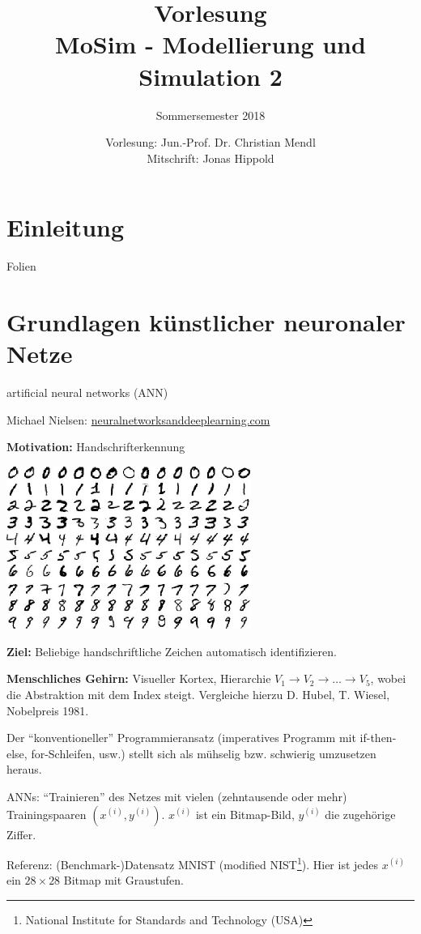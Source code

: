 \documentclass[
 a4paper,
 12pt,
 parskip=half
 ]{scrreprt}
\title{%
  Vorlesung\\
  MoSim - Modellierung und Simulation 2
}
\subtitle{Sommersemester 2018}
\author{%
  Vorlesung: Jun.-Prof. Dr. Christian Mendl\\
  Mitschrift: Jonas Hippold
}
\theoremstyle{plain}
\theoremstyle{definition}
\begin{document}
\maketitle

\tableofcontents

\chapter{Einleitung}

Folien

\chapter{Grundlagen künstlicher neuronaler Netze}
artificial neural networks (ANN)

Michael Nielsen: \url{neuralnetworksanddeeplearning.com}

\textbf{Motivation:} Handschrifterkennung
\begin{center}
  \includegraphics[width=8cm]{img/handwriting.jpg}
\end{center}

\textbf{Ziel:} Beliebige handschriftliche Zeichen automatisch identifizieren.

\textbf{Menschliches Gehirn:} Visueller Kortex, Hierarchie $V_1 \to V_2 \to
\ldots \to V_5$, wobei die Abstraktion mit dem Index steigt. Vergleiche hierzu
D. Hubel, T. Wiesel, Nobelpreis 1981.

Der ``konventioneller'' Programmieransatz (imperatives Programm mit
if-then-else, for-Schleifen, usw.) stellt sich als mühselig bzw. schwierig
umzusetzen heraus.

ANNs: ``Trainieren'' des Netzes mit vielen (zehntausende oder mehr)
Trainingspaaren $(x^{(i)}, y^{(i)})$. $x^{(i)}$ ist ein Bitmap-Bild, $y^{(i)}$
die zugehörige Ziffer.

Referenz: (Benchmark-)Datensatz MNIST (modified NIST\footnote{%
  National Institute for Standards and Technology (USA)
}). Hier ist jedes $x^{(i)}$ ein $28 \times 28$ Bitmap mit Graustufen.
\end{document}

